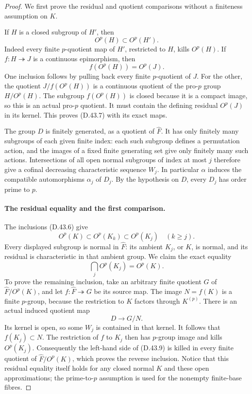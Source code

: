 \begin{proof}
We first prove the residual and quotient
comparisons without a finiteness assumption
on \(K\).

If \(H\) is a closed subgroup of \(H'\), then
\[
                         O^p(H)\subset O^p(H').
 \tag{D.43.6}
\]
Indeed every finite \(p\)-quotient map of
\(H'\), restricted to \(H\), kills \(O^p(H)\).
If \(f:H\twoheadrightarrow J\) is a continuous
epimorphism, then
\[
                         f(O^p(H))=O^p(J).
 \tag{D.43.7}
\]
One inclusion follows by pulling back every
finite \(p\)-quotient of \(J\).
For the other, the quotient
\(J/f(O^p(H))\) is a continuous quotient of
the pro-\(p\) group \(H/O^p(H)\).
The subgroup \(f(O^p(H))\) is closed because
it is a compact image, so this is an actual
pro-\(p\) quotient.
It must contain the defining residual
\(O^p(J)\) in its kernel.
This proves \textup{(D.43.7)} with its exact
maps.

The group \(D\) is finitely generated,
as a quotient of \(\widehat F\).
It has only finitely many subgroups of each
given finite index: each such subgroup
defines a permutation action, and the
images of a fixed finite generating set
give only finitely many such actions.
Intersections of all open normal subgroups
of index at most \(j\) therefore give a
cofinal decreasing characteristic sequence
\(W_j\).
In particular \(\alpha\) induces the
compatible automorphisms \(\alpha_j\)
of \(D_j\).
By the hypothesis on \(D\), every \(D_j\)
has order prime to \(p\).

\paragraph{The residual equality and the first comparison.}
The inclusions \textup{(D.43.6)} give
\[
 O^p(K)\subset O^p(K_k)\subset O^p(K_j)
                         \quad(k\geq j).
 \tag{D.43.8}
\]
Every displayed subgroup is normal in
\(\widehat F\): its ambient \(K_j\), or
\(K\), is normal, and its residual is
characteristic in that ambient group.
We claim the exact equality
\[
                   \bigcap_j O^p(K_j)=O^p(K).
 \tag{D.43.9}
\]
To prove the remaining inclusion, take an
arbitrary finite quotient \(G\) of
\(\widehat F/O^p(K)\), and let
\(f:\widehat F\twoheadrightarrow G\)
be its source map.
The image \(N=f(K)\) is a finite
\(p\)-group, because the restriction to
\(K\) factors through \(K^{(p)}\).
There is an actual induced quotient map
\[
                          D\longrightarrow G/N.
 \tag{D.43.10}
\]
Its kernel is open, so some \(W_j\)
is contained in that kernel.
It follows that \(f(K_j)\subset N\).
The restriction of \(f\) to \(K_j\)
then has \(p\)-group image and kills
\(O^p(K_j)\).
Consequently the left-hand side of
\textup{(D.43.9)} is killed in every
finite quotient of
\(\widehat F/O^p(K)\), which proves
the reverse inclusion.
Notice that this residual equality
itself holds for any closed normal \(K\)
and these open approximations; the
prime-to-\(p\) assumption is used for
the nonempty finite-base fibres.


\end{proof}
